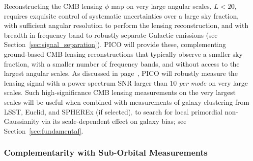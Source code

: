 \documentclass[PICOReport.tex]{subfiles}
\begin{document}
Reconstructing the CMB lensing $\phi$ map on very large angular scales, $L<20$, requires exquisite control of systematic uncertainties over a large sky fraction, with sufficient angular resolution to perform the lensing reconstruction, and with breadth in frequency band to robustly separate Galactic emissions (see Section~\ref{sec:signal_separation}). PICO will provide these, complementing ground-based CMB lensing reconstructions that typically observe a smaller sky fraction, with a smaller number of frequency bands, and without access to the largest angular scales. As discussed in page~\pageref{lensing}, PICO will robustly measure the lensing signal with a power spectrum \ac{SNR} larger than 10 {\it per mode} on very large scales. Such high-significance CMB lensing measurements on the very largest scales will be useful when combined with measurements of galaxy clustering from LSST, Euclid, and SPHEREx (if selected),  to search for local primordial non-Gaussianity via its scale-dependent effect on galaxy bias; see Section~\ref{sec:fundamental}.


\subsubsection{Complementarity with Sub-Orbital Measurements}
\end{document}
